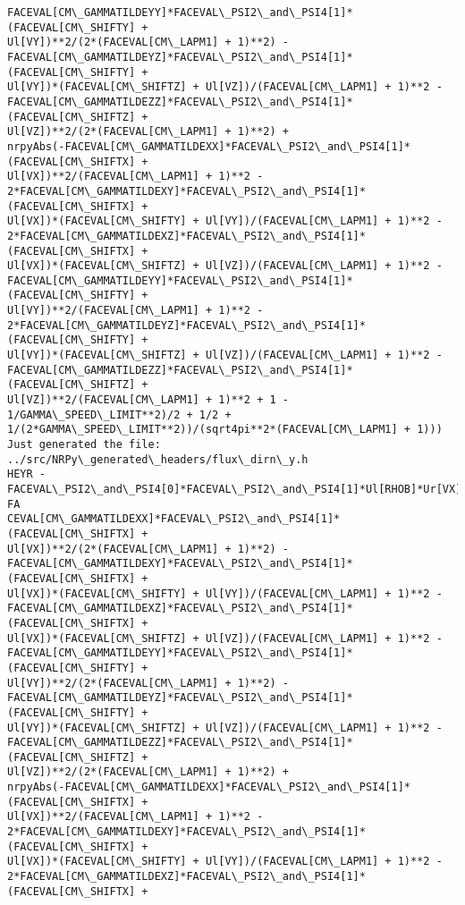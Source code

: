 \documentclass[landscape,letterpaper,10pt,english]{article}
\begin{document}
\begin{Verbatim}[commandchars=\\\{\}]
FACEVAL[CM\_GAMMATILDEYY]*FACEVAL\_PSI2\_and\_PSI4[1]*(FACEVAL[CM\_SHIFTY] +
Ul[VY])**2/(2*(FACEVAL[CM\_LAPM1] + 1)**2) -
FACEVAL[CM\_GAMMATILDEYZ]*FACEVAL\_PSI2\_and\_PSI4[1]*(FACEVAL[CM\_SHIFTY] +
Ul[VY])*(FACEVAL[CM\_SHIFTZ] + Ul[VZ])/(FACEVAL[CM\_LAPM1] + 1)**2 -
FACEVAL[CM\_GAMMATILDEZZ]*FACEVAL\_PSI2\_and\_PSI4[1]*(FACEVAL[CM\_SHIFTZ] +
Ul[VZ])**2/(2*(FACEVAL[CM\_LAPM1] + 1)**2) +
nrpyAbs(-FACEVAL[CM\_GAMMATILDEXX]*FACEVAL\_PSI2\_and\_PSI4[1]*(FACEVAL[CM\_SHIFTX] +
Ul[VX])**2/(FACEVAL[CM\_LAPM1] + 1)**2 -
2*FACEVAL[CM\_GAMMATILDEXY]*FACEVAL\_PSI2\_and\_PSI4[1]*(FACEVAL[CM\_SHIFTX] +
Ul[VX])*(FACEVAL[CM\_SHIFTY] + Ul[VY])/(FACEVAL[CM\_LAPM1] + 1)**2 -
2*FACEVAL[CM\_GAMMATILDEXZ]*FACEVAL\_PSI2\_and\_PSI4[1]*(FACEVAL[CM\_SHIFTX] +
Ul[VX])*(FACEVAL[CM\_SHIFTZ] + Ul[VZ])/(FACEVAL[CM\_LAPM1] + 1)**2 -
FACEVAL[CM\_GAMMATILDEYY]*FACEVAL\_PSI2\_and\_PSI4[1]*(FACEVAL[CM\_SHIFTY] +
Ul[VY])**2/(FACEVAL[CM\_LAPM1] + 1)**2 -
2*FACEVAL[CM\_GAMMATILDEYZ]*FACEVAL\_PSI2\_and\_PSI4[1]*(FACEVAL[CM\_SHIFTY] +
Ul[VY])*(FACEVAL[CM\_SHIFTZ] + Ul[VZ])/(FACEVAL[CM\_LAPM1] + 1)**2 -
FACEVAL[CM\_GAMMATILDEZZ]*FACEVAL\_PSI2\_and\_PSI4[1]*(FACEVAL[CM\_SHIFTZ] +
Ul[VZ])**2/(FACEVAL[CM\_LAPM1] + 1)**2 + 1 - 1/GAMMA\_SPEED\_LIMIT**2)/2 + 1/2 +
1/(2*GAMMA\_SPEED\_LIMIT**2))/(sqrt4pi**2*(FACEVAL[CM\_LAPM1] + 1)))
Just generated the file: ../src/NRPy\_generated\_headers/flux\_dirn\_y.h
HEYR -FACEVAL\_PSI2\_and\_PSI4[0]*FACEVAL\_PSI2\_and\_PSI4[1]*Ul[RHOB]*Ur[VX]/sqrt(-FA
CEVAL[CM\_GAMMATILDEXX]*FACEVAL\_PSI2\_and\_PSI4[1]*(FACEVAL[CM\_SHIFTX] +
Ul[VX])**2/(2*(FACEVAL[CM\_LAPM1] + 1)**2) -
FACEVAL[CM\_GAMMATILDEXY]*FACEVAL\_PSI2\_and\_PSI4[1]*(FACEVAL[CM\_SHIFTX] +
Ul[VX])*(FACEVAL[CM\_SHIFTY] + Ul[VY])/(FACEVAL[CM\_LAPM1] + 1)**2 -
FACEVAL[CM\_GAMMATILDEXZ]*FACEVAL\_PSI2\_and\_PSI4[1]*(FACEVAL[CM\_SHIFTX] +
Ul[VX])*(FACEVAL[CM\_SHIFTZ] + Ul[VZ])/(FACEVAL[CM\_LAPM1] + 1)**2 -
FACEVAL[CM\_GAMMATILDEYY]*FACEVAL\_PSI2\_and\_PSI4[1]*(FACEVAL[CM\_SHIFTY] +
Ul[VY])**2/(2*(FACEVAL[CM\_LAPM1] + 1)**2) -
FACEVAL[CM\_GAMMATILDEYZ]*FACEVAL\_PSI2\_and\_PSI4[1]*(FACEVAL[CM\_SHIFTY] +
Ul[VY])*(FACEVAL[CM\_SHIFTZ] + Ul[VZ])/(FACEVAL[CM\_LAPM1] + 1)**2 -
FACEVAL[CM\_GAMMATILDEZZ]*FACEVAL\_PSI2\_and\_PSI4[1]*(FACEVAL[CM\_SHIFTZ] +
Ul[VZ])**2/(2*(FACEVAL[CM\_LAPM1] + 1)**2) +
nrpyAbs(-FACEVAL[CM\_GAMMATILDEXX]*FACEVAL\_PSI2\_and\_PSI4[1]*(FACEVAL[CM\_SHIFTX] +
Ul[VX])**2/(FACEVAL[CM\_LAPM1] + 1)**2 -
2*FACEVAL[CM\_GAMMATILDEXY]*FACEVAL\_PSI2\_and\_PSI4[1]*(FACEVAL[CM\_SHIFTX] +
Ul[VX])*(FACEVAL[CM\_SHIFTY] + Ul[VY])/(FACEVAL[CM\_LAPM1] + 1)**2 -
2*FACEVAL[CM\_GAMMATILDEXZ]*FACEVAL\_PSI2\_and\_PSI4[1]*(FACEVAL[CM\_SHIFTX] +

\end{Verbatim}
\end{document}
